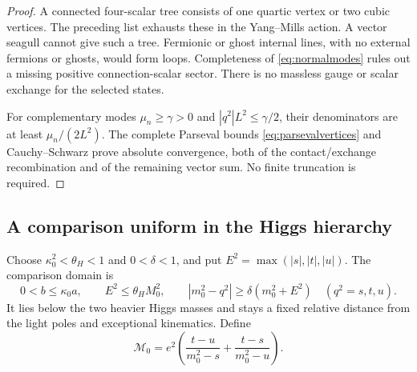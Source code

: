 \begin{proof}
A connected four-scalar tree consists of one quartic vertex or two
cubic vertices. The preceding list exhausts these in the Yang--Mills
action. A vector seagull cannot give such a tree. Fermionic or ghost
internal lines, with no external fermions or ghosts, would form loops.
Completeness of \eqref{eq:normalmodes} rules out a missing positive
connection-scalar sector. There is no massless gauge or scalar exchange
for the selected states.

For complementary modes $\mu_n\ge\gamma>0$ and
$|q^2|L^2\le\gamma/2$, their denominators are at least
$\mu_n/(2L^2)$. The complete Parseval bounds
\eqref{eq:parsevalvertices} and Cauchy--Schwarz prove absolute
convergence, both of the contact/exchange recombination and of the
remaining vector sum. No finite truncation is required.
\end{proof}

\subsection{A comparison uniform in the Higgs hierarchy}
Choose $\kappa_0^2<\theta_H<1$ and $0<\delta<1$, and put
$E^2=\max(|s|,|t|,|u|)$. The comparison domain is
\begin{equation}\label{eq:amplitudedomain}
 0<b\le\kappa_0a,\qquad E^2\le\theta_H M_0^2,\qquad
 |m_0^2-q^2|\ge\delta(m_0^2+E^2)\quad(q^2=s,t,u).
\end{equation}
It lies below the two heavier Higgs masses and stays a fixed relative
distance from the light poles and exceptional kinematics. Define
\begin{equation}\label{eq:modelamplitude}
 \mathcal M_0=e^2\left(\frac{t-u}{m_0^2-s}
                         +\frac{t-s}{m_0^2-u}\right).
\end{equation}

